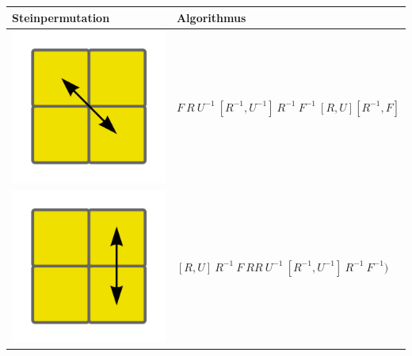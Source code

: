 \documentclass[12pt,a4paper, usenames, dvipsnames]{article}
\theoremstyle{mystyle}
\theoremstyle{definition}
\begin{document}
\begin{center}
\begin{tabular}{m{4cm} m{8cm}}
\toprule
Steinpermutation & Algorithmus  \\
\midrule
\includegraphics[scale=0.08]{corners1.png}  & $F \ R \ U^{-1} \ [R^{-1}, U^{-1}] \ R^{-1} \ F^{-1}  \ [R, U]   [R^{-1}, F]$ \\
\includegraphics[scale=0.08]{corners2.png}   & $[R,U] \  R^{-1} \ F \ RR \   U^{-1} \ [R^{-1}, U^{-1}] \ R^{-1} \  F^{-1})$ \\

\end{tabular}
\end{center}
\end{document}
